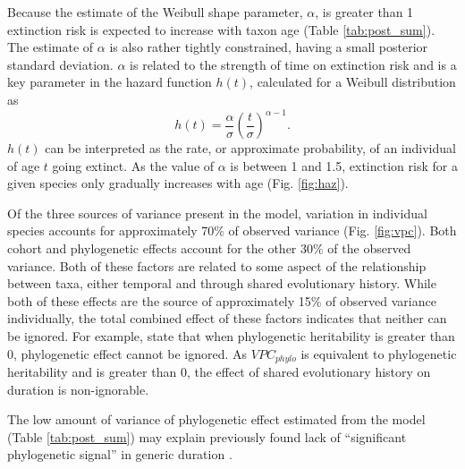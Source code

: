 \documentclass[12pt,letterpaper]{article}
\begin{document}
Because the estimate of the Weibull shape parameter, \(\alpha\), is greater than 1 extinction risk is expected to increase with taxon age (Table \ref{tab:post_sum}). The estimate of \(\alpha\) is also rather tightly constrained, having a small posterior standard deviation. \(\alpha\) is related to the strength of time on extinction risk and is a key parameter in the hazard function \(h(t)\), calculated for a Weibull distribution as
\begin{equation}
  h(t) = \frac{\alpha}{\sigma}\left(\frac{t}{\sigma}\right)^{\alpha - 1}.
\end{equation}
\(h(t)\) can be interpreted as the rate, or approximate probability, of an individual of age \(t\) going extinct. As the value of \(\alpha\) is between 1 and 1.5, extinction risk for a given species only gradually increases with age (Fig. \ref{fig:haz}). 

Of the three sources of variance present in the model, variation in individual species accounts for approximately 70\% of observed variance (Fig. \ref{fig:vpc}). Both cohort and phylogenetic effects account for the other 30\% of the observed variance. Both of these factors are related to some aspect of the relationship between taxa, either temporal and through shared evolutionary history. While both of these effects are the source of approximately 15\% of observed variance individually, the total combined effect of these factors indicates that neither can be ignored. For example, \citet{Housworth2004} state that when phylogenetic heritability is greater than 0, phylogenetic effect cannot be ignored. As \(VPC_{phylo}\) is equivalent to phylogenetic heritability and is greater than 0, the effect of shared evolutionary history on duration is non-ignorable.

The low amount of variance of phylogenetic effect estimated from the model (Table \ref{tab:post_sum}) may explain previously found lack of ``significant phylogenetic signal'' in generic duration \citep{Tomiya2013}.



\end{document}
